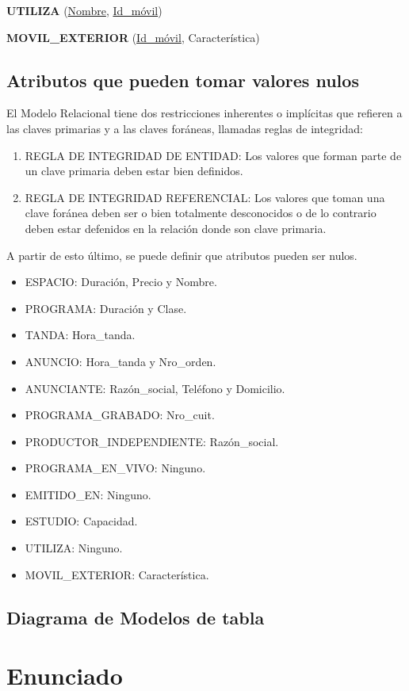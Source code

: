 \documentclass[a4paper,10pt]{article}
\begin{document}
    \begin{flushleft}
      {\bf{UTILIZA}} (\underline{Nombre}, \underline{Id\_m\'ovil})
    \end{flushleft}
  
    \begin{flushleft}
      {\bf{MOVIL\_EXTERIOR}} (\underline{Id\_m\'ovil}, Caracter\'istica)
    \end{flushleft}

  \subsection{Atributos que pueden tomar valores nulos}
    \begin{flushleft}
      El Modelo Relacional tiene dos restricciones inherentes o impl\'icitas que refieren a las claves primarias y a las claves for\'aneas, llamadas reglas de integridad: 
    \end{flushleft}

    \begin{enumerate}
    \item REGLA DE INTEGRIDAD DE ENTIDAD: Los valores que forman parte de un clave primaria deben estar bien definidos.
    \item REGLA DE INTEGRIDAD REFERENCIAL: Los valores que toman una clave for\'anea deben ser o bien totalmente desconocidos o de lo contrario deben estar defenidos en la relaci\'on donde son clave primaria. 
    \end{enumerate}

    \begin{flushleft}
      A partir de esto \'ultimo, se puede definir que atributos pueden ser nulos.
    \end{flushleft}

    \begin{itemize}
      \item ESPACIO: Duraci\'on, Precio y Nombre.
      \item PROGRAMA: Duraci\'on y Clase.
      \item TANDA: Hora\_tanda.
      \item ANUNCIO: Hora\_tanda y Nro\_orden.
      \item ANUNCIANTE: Raz\'on\_social, Tel\'efono y Domicilio.
      \item PROGRAMA\_GRABADO: Nro\_cuit.
      \item PRODUCTOR\_INDEPENDIENTE: Raz\'on\_social.
      \item PROGRAMA\_EN\_VIVO: Ninguno.
      \item EMITIDO\_EN: Ninguno.
      \item ESTUDIO: Capacidad.
      \item UTILIZA: Ninguno.
      \item MOVIL\_EXTERIOR: Caracter\'istica.
    \end{itemize}
    
  \subsection{Diagrama de Modelos de tabla}
    \begin{flushleft}
    \end{flushleft}

\appendix
\newpage
\section{Enunciado}
  
\end{document}

